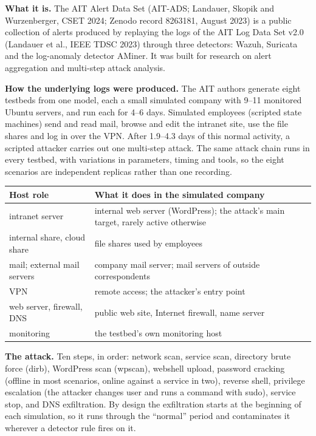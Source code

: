 \documentclass[10.5pt,a4paper]{article}
\newcommand{\sub}[1]{\par\smallskip\noindent\textbf{#1}\quad}
\begin{document}
\sub{What it is.} The AIT Alert Data Set (AIT-ADS; Landauer, Skopik and Wurzenberger, CSET 2024; Zenodo record 8263181, August 2023) is a public collection of alerts produced by replaying the logs of the AIT Log Data Set v2.0 (Landauer et al., IEEE TDSC 2023) through three detectors: Wazuh, Suricata and the log-anomaly detector AMiner. It was built for research on alert aggregation and multi-step attack analysis.

\sub{How the underlying logs were produced.} The AIT authors generate eight testbeds from one model, each a small simulated company with 9--11 monitored Ubuntu servers, and run each for 4--6 days. Simulated employees (scripted state machines) send and read mail, browse and edit the intranet site, use the file shares and log in over the VPN. After 1.9--4.3 days of this normal activity, a scripted attacker carries out one multi-step attack. The same attack chain runs in every testbed, with variations in parameters, timing and tools, so the eight scenarios are independent replicas rather than one recording.

\begin{center}\small
\begin{tabularx}{\linewidth}{@{}l X@{}}
\toprule
Host role & What it does in the simulated company \\
\midrule
intranet server & internal web server (WordPress); the attack's main target, rarely active otherwise \\
internal share, cloud share & file shares used by employees \\
mail; external mail servers & company mail server; mail servers of outside correspondents \\
VPN & remote access; the attacker's entry point \\
web server, firewall, DNS & public web site, Internet firewall, name server \\
monitoring & the testbed's own monitoring host \\
\bottomrule
\end{tabularx}
\end{center}

\sub{The attack.} Ten steps, in order: network scan, service scan, directory brute force (dirb), WordPress scan (wpscan), webshell upload, password cracking (offline in most scenarios, online against a service in two), reverse shell, privilege escalation (the attacker changes user and runs a command with sudo), service stop, and DNS exfiltration. By design the exfiltration starts at the beginning of each simulation, so it runs through the ``normal'' period and contaminates it wherever a detector rule fires on it.
\end{document}
